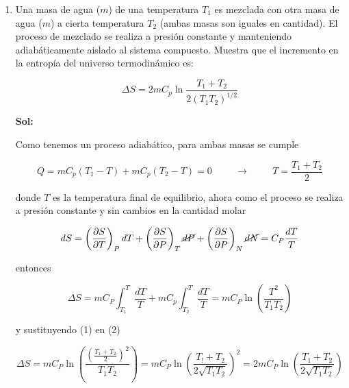 \documentclass[12pt,a4paper]{article}
\begin{document}
\begin{enumerate}






    \item Una masa de agua ($m$) de una temperatura $T_1$ es mezclada con otra masa de agua ($m$) a cierta temperatura $T_2$ (ambas masas son iguales en cantidad). El proceso de mezclado se realiza a presión constante y manteniendo adiabáticamente aislado al sistema compuesto. Muestra que el incremento en la entropía del universo termodinámico es:
    
    \begin{equation*}
        \Delta S = 2 m C_p \ln{\frac{T_1 + T_2}{2(T_1 T_2)^{1/2}}} 
    \end{equation*}
    
    \textbf{Sol:}
    
    Como tenemos un proceso adiabático, para ambas masas se cumple
    
    \begin{equation}
        Q = m C_p (T_1 - T) + m C_p (T_2 - T) = 0 \hspace{1cm} \rightarrow \hspace{1cm} T = \frac{T_1 + T_2}{2}
    \end{equation}
    
    donde $T$ es la temperatura final de equilibrio, ahora como el proceso se realiza a presión constante y sin cambios en la cantidad molar
    
    \begin{equation*}
        dS = \left(\frac{\partial S}{\partial T}\right)_{P} dT + \left(\frac{\partial S}{\partial P}\right)_{T} \cancel{dP} + \left(\frac{\partial S}{\partial P}\right)_{N} \cancel{dN}  = C_P \frac{dT}{T} 
    \end{equation*}
    
    entonces
    
    \begin{equation}
        \Delta S = m C_P \int_{T_1}^{T} \frac{dT}{T} + m C_p \int_{T_2}^{T} \frac{dT}{T} =  m C_P \ln{\left(\frac{T^2}{T_1 T_2}\right)}
    \end{equation}
    
    y sustituyendo (1) en (2)
    
    \begin{equation}
        \Delta S = m C_P \ln{\left(\frac{\left(\frac{T_1 + T_2}{2}\right)^2}{T_1 T_2}\right)} = m C_P \ln{\left(\frac{T_! + T_2}{2 \sqrt{T_1 T_2}}\right)^2} = 2 m C_P \ln{\left(\frac{T_1 + T_2}{2 \sqrt{T_1 T_2}}\right)}
    \end{equation}
    

\end{enumerate}
\end{document}
